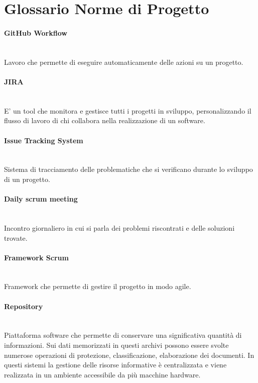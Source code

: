 \section{Glossario Norme di Progetto}

\paragraph{GitHub Workflow}~\smallskip \\
Lavoro che permette di eseguire automaticamente delle azioni su un progetto.

\paragraph{JIRA}~\smallskip \\
E' un tool che monitora e gestisce tutti i progetti in sviluppo, personalizzando il flusso di lavoro di chi collabora nella realizzazione di un software.

\paragraph{Issue Tracking System}~\smallskip \\
Sistema di tracciamento delle problematiche che si verificano durante lo sviluppo di un progetto.

\paragraph{Daily scrum meeting}~\smallskip \\
Incontro giornaliero in cui si parla dei problemi riscontrati e delle soluzioni trovate.

\paragraph{Framework Scrum}~\smallskip \\
Framework che permette di gestire il progetto in modo agile.

\paragraph{Repository}~\smallskip \\
Piattaforma software che permette di conservare una significativa quantità di informazioni. Sui dati memorizzati in questi archivi possono essere svolte numerose operazioni di protezione, classificazione, elaborazione dei documenti. In questi sistemi la gestione delle risorse informative è centralizzata e viene realizzata in un ambiente accessibile da più macchine hardware.

